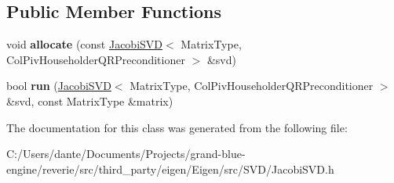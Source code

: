 \subsection*{Public Member Functions}
\begin{DoxyCompactItemize}
\item 
\mbox{\label{class_eigen_1_1internal_1_1qr__preconditioner__impl_3_01_matrix_type_00_01_col_piv_householder_q9febbd0c27c13f65b619ca11d9f35cb8_ab4cbdc0bda98095ba9bbae49ea1d550d}} 
void {\bfseries allocate} (const \mbox{\hyperlink{class_eigen_1_1_jacobi_s_v_d}{Jacobi\+S\+VD}}$<$ Matrix\+Type, Col\+Piv\+Householder\+Q\+R\+Preconditioner $>$ \&svd)
\item 
\mbox{\label{class_eigen_1_1internal_1_1qr__preconditioner__impl_3_01_matrix_type_00_01_col_piv_householder_q9febbd0c27c13f65b619ca11d9f35cb8_a0ab01429feb699987a2e7003327e4ba5}} 
bool {\bfseries run} (\mbox{\hyperlink{class_eigen_1_1_jacobi_s_v_d}{Jacobi\+S\+VD}}$<$ Matrix\+Type, Col\+Piv\+Householder\+Q\+R\+Preconditioner $>$ \&svd, const Matrix\+Type \&matrix)
\end{DoxyCompactItemize}


The documentation for this class was generated from the following file\+:\begin{DoxyCompactItemize}
\item 
C\+:/\+Users/dante/\+Documents/\+Projects/grand-\/blue-\/engine/reverie/src/third\+\_\+party/eigen/\+Eigen/src/\+S\+V\+D/Jacobi\+S\+V\+D.\+h\end{DoxyCompactItemize}
